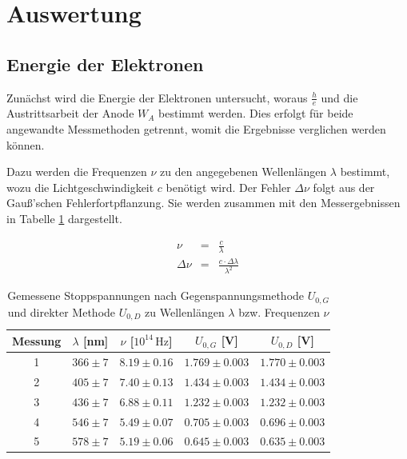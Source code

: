\documentclass[12pt,a4paper]{scrartcl}
\numberwithin{equation}{section} %
\begin{document}
\clearpage
\hypertarget{auswertung}{\section{Auswertung}\label{auswertung}}
\subsection{Energie der Elektronen}
\label{auswertung:h/e}

Zunächst wird die Energie der Elektronen untersucht, woraus $\frac{h}{e}$ und die Austrittsarbeit der Anode $W_A$ bestimmt werden. Dies erfolgt für beide angewandte Messmethoden getrennt, womit die Ergebnisse verglichen werden können.

Dazu werden die Frequenzen $\nu$ zu den angegebenen Wellenlängen $\lambda$ bestimmt, wozu die Lichtgeschwindigkeit $c$ benötigt wird. Der Fehler $\Delta \nu$ folgt aus der Gauß'schen Fehlerfortpflanzung. Sie werden zusammen mit den Messergebnissen in Tabelle \ref{table:Messwerte Energie} dargestellt.

\begin{eqnarray}
	\nu &=& \frac{c}{\lambda} \label{eq:frequenzWellenlänge} \\
	\Delta \nu &=& \frac{c \cdot \Delta \lambda}{\lambda^2}
\end{eqnarray}

\begin{table}[h!]
	\centering
	\begin{tabular}{c|c|c|c|c}
		Messung & $\lambda$ [nm] & $\nu$ [$10^{14} \mathrm{\, Hz}$] & $U_{0,G}$ [V] & $U_{0,D}$ [V] \\
		\hline
		1 & $366 \pm 7$ & $8.19 \pm 0.16$ & $1.769 \pm 0.003$ & $1.770 \pm 0.003$ \\
		2 & $405 \pm 7$ & $7.40 \pm 0.13$ & $1.434 \pm 0.003$ & $1.434 \pm 0.003$ \\
		3 & $436 \pm 7$ & $6.88 \pm 0.11$ & $1.232 \pm 0.003$ & $1.232 \pm 0.003$ \\
		4 & $546 \pm 7$ & $5.49 \pm 0.07$ & $0.705 \pm 0.003$ & $0.696 \pm 0.003$ \\
		5 & $578 \pm 7$ & $5.19 \pm 0.06$ & $0.645 \pm 0.003$ & $0.635 \pm 0.003$
	\end{tabular}
	\caption{Gemessene Stoppspannungen nach Gegenspannungsmethode $U_{0,G}$ und direkter Methode $U_{0,D}$ zu Wellenlängen $\lambda$ bzw. Frequenzen $\nu$}
	\label{table:Messwerte Energie}
\end{table}
\end{document}
